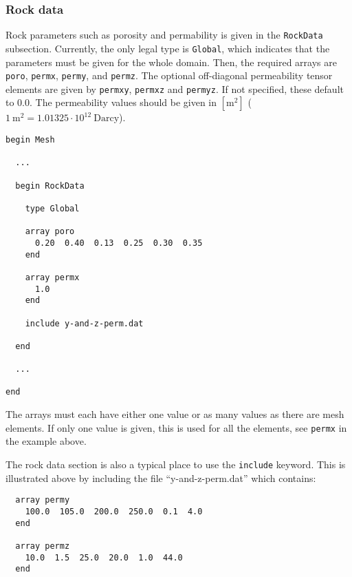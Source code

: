 \subsubsection{Rock data}
\label{sec:rock-data}

Rock parameters such as porosity and permability is given in the
\texttt{RockData} subsection. Currently, the only legal type is
\texttt{Global}, which indicates that the parameters must be given for
the whole domain. Then, the required arrays are \texttt{poro},
\texttt{permx}, \texttt{permy}, and \texttt{permz}. The optional
off-diagonal permeability tensor elements are given by
\texttt{permxy}, \texttt{permxz} and \texttt{permyz}. If not
specified, these default to 0.0. The permeability values should be
given in $[\text{m}^2]$ ($1\: \text{m}^2 = 1.01325\cdot 10^{12}\:\text{Darcy}$).

\begin{verbatim}
begin Mesh

  ... 

  begin RockData

    type Global

    array poro
      0.20  0.40  0.13  0.25  0.30  0.35
    end

    array permx
      1.0
    end

    include y-and-z-perm.dat

  end

  ... 

end
\end{verbatim}
%
The arrays must each have either one value or as many values as there
are mesh elements. If only one value is given, this is used for all
the elements, see \texttt{permx} in the example above. 

The rock data section is also a typical place to use the
\texttt{include} keyword. This is illustrated above by including the
file ``y-and-z-perm.dat'' which contains:
%
\begin{verbatim}
  array permy
    100.0  105.0  200.0  250.0  0.1  4.0
  end

  array permz
    10.0  1.5  25.0  20.0  1.0  44.0
  end
\end{verbatim}


